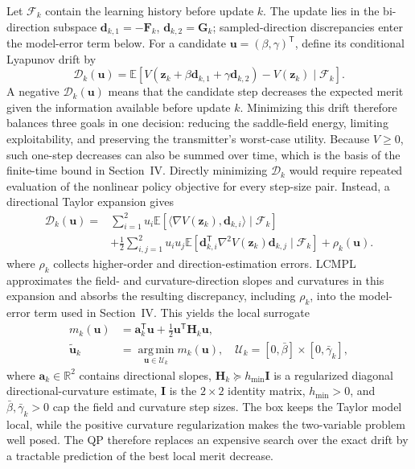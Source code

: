 \documentclass[conference]{IEEEtran}
\newcommand{\bF}{\bm{F}}
\newcommand{\bG}{\bm{G}}
\newcommand{\bz}{\bm{z}}
\newcommand{\bu}{\bm{u}}
\newcommand{\bd}{\bm{d}}
\newcommand{\ba}{\bm{a}}
\newcommand{\bH}{\bm{H}}
\newcommand{\E}{\mathbb{E}}
\begin{document}
Let $\mathcal F_k$ contain the learning history before update $k$.
The update lies in the bi-direction subspace $\bd_{k,1}=-\bF_k$, $\bd_{k,2}=\bG_k$; sampled-direction discrepancies enter the model-error term below.
For a candidate $\bu=(\beta,\gamma)^{\mathsf T}$, define its conditional Lyapunov drift by
\[
\mathcal D_k(\bu)=\E[V(\bz_k+\beta\bd_{k,1}+\gamma\bd_{k,2})-V(\bz_k)\mid\mathcal F_k].
\]
A negative $\mathcal D_k(\bu)$ means that the candidate step decreases the expected merit given the information available before update $k$.
Minimizing this drift therefore balances three goals in one decision: reducing the saddle-field energy, limiting exploitability, and preserving the transmitter's worst-case utility.
Because $V\geq0$, such one-step decreases can also be summed over time, which is the basis of the finite-time bound in Section~IV.
Directly minimizing $\mathcal D_k$ would require repeated evaluation of the nonlinear policy objective for every step-size pair.
Instead, a directional Taylor expansion gives
\[
\begin{aligned}
\mathcal D_k(\bu)
={}&\sum_{i=1}^{2}u_i\E[\langle\nabla V(\bz_k),\bd_{k,i}\rangle\mid\mathcal F_k]\\
&+\frac12\sum_{i,j=1}^{2}u_i u_j
\E[\bd_{k,i}^{\mathsf T}\nabla^2V(\bz_k)\bd_{k,j}\mid\mathcal F_k]
+\rho_k(\bu).
\end{aligned}
\]
where $\rho_k$ collects higher-order and direction-estimation errors.
LCMPL approximates the field- and curvature-direction slopes and curvatures in this expansion and absorbs the resulting discrepancy, including $\rho_k$, into the model-error term used in Section~IV.
This yields the local surrogate
\begin{equation}
\begin{aligned}
m_k(\bu)&=\ba_k^{\mathsf T}\bu+\tfrac12\bu^{\mathsf T}\bH_k\bu,\\
\widetilde{\bu}_k&=\operatorname*{arg\,min}_{\bu\in\mathcal U_k}m_k(\bu),
\quad
\mathcal U_k=[0,\bar\beta]\times[0,\bar\gamma_k],
\end{aligned}
\label{eq:boxqp}
\end{equation}
where $\ba_k\in\mathbb R^2$ contains directional slopes, $\bH_k\succeq h_{\min}\boldsymbol I$ is a regularized diagonal directional-curvature estimate, $\boldsymbol I$ is the $2\times2$ identity matrix, $h_{\min}>0$, and $\bar\beta,\bar\gamma_k>0$ cap the field and curvature step sizes.
The box keeps the Taylor model local, while the positive curvature regularization makes the two-variable problem well posed.
The QP therefore replaces an expensive search over the exact drift by a tractable prediction of the best local merit decrease.
\end{document}

